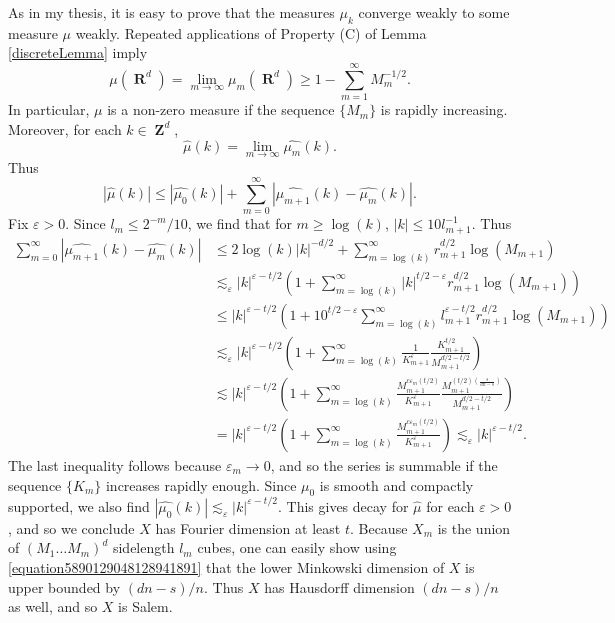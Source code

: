 \documentclass[12pt,reqno]{article}
\numberwithin{equation}{section}
\DeclareMathOperator{\RR}{\mathbf{R}}
\DeclareMathOperator{\ZZ}{\mathbf{Z}}
\begin{document}
As in my thesis, it is easy to prove that the measures $\mu_k$ converge weakly to some measure $\mu$ weakly. Repeated applications of Property (C) of Lemma \ref{discreteLemma} imply
%
\[ \mu(\RR^d) = \lim_{m \to \infty} \mu_m(\RR^d) \geq 1 - \sum_{m=1}^\infty M_m^{-1/2}. \]
%
In particular, $\mu$ is a non-zero measure if the sequence $\{ M_m \}$ is rapidly increasing. Moreover, for each $k \in \ZZ^d$,
%
\[ \widehat{\mu}(k) = \lim_{m \to \infty} \widehat{\mu_m}(k). \]
%
Thus
%
\[ |\widehat{\mu}(k)| \leq |\widehat{\mu_0}(k)| + \sum_{m = 0}^\infty |\widehat{\mu_{m+1}}(k) - \widehat{\mu_m}(k)|. \]
%
Fix $\varepsilon > 0$. Since $l_m \leq 2^{-m}/10$, we find that for $m \geq \log(k)$, $|k| \leq 10 l_{m+1}^{-1}$. Thus
%
\begin{align*}
    \sum_{m = 0}^\infty |\widehat{\mu_{m+1}}(k) - \widehat{\mu_m}(k)| &\leq 2 \log(k) |k|^{-d/2} + \sum_{m = \log(k)}^\infty r_{m+1}^{d/2} \log(M_{m+1})\\
    &\lesssim_\varepsilon |k|^{\varepsilon- t/2} \left( 1 + \sum_{m = \log(k)}^\infty |k|^{t/2-\varepsilon} r_{m+1}^{d/2} \log(M_{m+1}) \right)\\
    &\leq |k|^{\varepsilon - t/2} \left( 1 + 10^{t/2 - \varepsilon} \sum_{m = \log(k)}^\infty l_{m+1}^{\varepsilon - t/2} r_{m+1}^{d/2} \log(M_{m+1}) \right)\\
    &\lesssim_\varepsilon |k|^{\varepsilon - t/2} \left( 1 + \sum_{m = \log(k)}^\infty \frac{1}{K_{m+1}^{\varepsilon}} \frac{K_{m+1}^{t/2}}{M_{m+1}^{d/2 - t/2}} \right)\\
    &\lesssim |k|^{\varepsilon - t/2} \left( 1 + \sum_{m = \log(k)}^\infty \frac{M_{m+1}^{c\varepsilon_m (t/2)}}{K_{m+1}^\varepsilon} \frac{M_{m+1}^{(t/2) \left( \frac{s}{dn-s} \right)}}{M_{m+1}^{d/2 - t/2}} \right)\\
    &= |k|^{\varepsilon - t/2} \left( 1 + \sum_{m = \log(k)}^\infty \frac{M_{m+1}^{c\varepsilon_m (t/2)}}{K_{m+1}^{\varepsilon}} \right) \lesssim_\varepsilon |k|^{\varepsilon - t/2}.
\end{align*}
%
The last inequality follows because $\varepsilon_m \to 0$, and so the series is summable if the sequence $\{ K_m \}$ increases rapidly enough. Since $\mu_0$ is smooth and compactly supported, we also find $|\widehat{\mu_0}(k)| \lesssim_\varepsilon |k|^{\varepsilon - t/2}$. This gives decay for $\widehat{\mu}$ for each $\varepsilon > 0$, and so we conclude $X$ has Fourier dimension at least $t$. Because $X_m$ is the union of $(M_1 \dots M_m)^d$ sidelength $l_m$ cubes, one can easily show using \eqref{equation5890129048128941891} that the lower Minkowski dimension of $X$ is upper bounded by $(dn - s)/n$. Thus $X$ has Hausdorff dimension $(dn - s)/n$ as well, and so $X$ is Salem.
\end{document}
